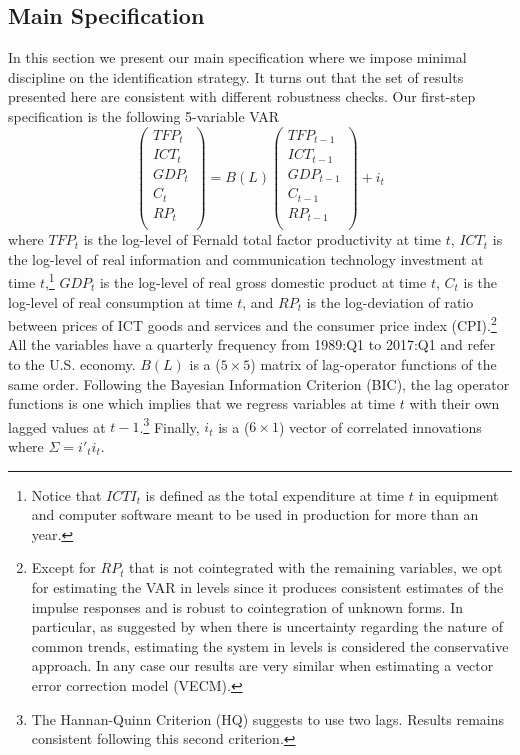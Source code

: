 \documentclass[12pt]{article}
\begin{document}
\subsection{Main Specification}

In this section we present our main specification where we impose minimal discipline on the identification strategy. It turns out that the set of results presented here are consistent with different robustness checks. Our first-step specification is the following 5-variable VAR 
\begin{equation}\label{eq:mainSpecification}
\begin{pmatrix}
TFP_t \\ 
ICT_t \\
GDP_t \\
C_t \\
RP_t \\
\end{pmatrix} = B(L) \begin{pmatrix}
TFP_{t-1} \\ 
ICT_{t-1} \\
GDP_{t-1} \\
C_{t-1} \\
RP_{t-1} \\
\end{pmatrix} + i_t
\end{equation}
where $TFP_t$ is the log-level of Fernald total factor productivity at time $t$, $ICT_{t}$ is the log-level of real information and communication technology investment at time $t$,\footnote{Notice that $ICTI_t$ is defined as the total expenditure at time $t$ in equipment and computer software meant to be used in production for more than an year.} $GDP_t$ is the log-level of real gross domestic product at time $t$, $C_t$ is the log-level of real consumption at time $t$, and $RP_t$ is the log-deviation of ratio between prices of ICT goods and services and the consumer price index (CPI).\footnote{Except for $RP_t$ that is not cointegrated with the remaining variables, we opt for estimating the VAR in levels since it produces consistent estimates of the impulse responses and is robust to cointegration of unknown forms. In particular, as suggested by \cite{hamilton1994time} when there is uncertainty regarding the nature of common trends, estimating the system in levels is considered the conservative approach. In any case our results are very similar when estimating a vector error correction model (VECM).} All the variables have a quarterly frequency from 1989:Q1 to 2017:Q1 and refer to the U.S. economy. $B(L)$ is a ($5\times 5$) matrix of lag-operator functions of the same order. Following the Bayesian Information Criterion (BIC), the lag operator functions is one which implies that we regress variables at time $t$ with their own lagged values at $t-1$.\footnote{The Hannan-Quinn Criterion (HQ) suggests to use two lags. Results remains consistent following this second criterion.} Finally, $i_t$ is a ($6\times 1$) vector of correlated innovations where $\Sigma = i'_t i_t$.
\end{document}
